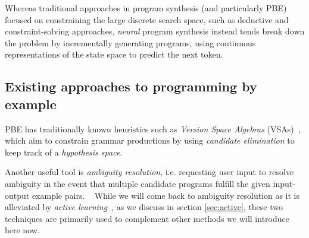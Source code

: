 \documentclass{article}
\begin{document}
Whereas traditional approaches in program synthesis (and particularly PBE) focused on constraining the large discrete search space,
such as deductive and constraint-solving approaches,
\emph{neural} program synthesis instead tends break down the problem by incrementally generating programs,
using continuous representations of the state space to predict the next token.

\subsection{Existing approaches to programming by example} \label{sec:pbe}

PBE has traditionally known heuristics such as
\emph{Version Space Algebras} (VSAs)~\citep{mitchell1982generalization},
which aim to constrain grammar productions by using
\emph{candidate elimination} to keep track of a \emph{hypothesis space}.

Another useful tool is \emph{ambiguity resolution},
i.e. requesting user input to resolve ambiguity
in the event that multiple candidate programs
fulfill the given input-output example pairs.%
~\citep{gulwani2017program}
While we will come back to ambiguity resolution as it is
alleviated by \emph{active learning}~\citep{settles2009active}, as we discuss in section \ref{sec:active},
these two techniques are primarily used to complement
other methods we will introduce here now.
\end{document}
